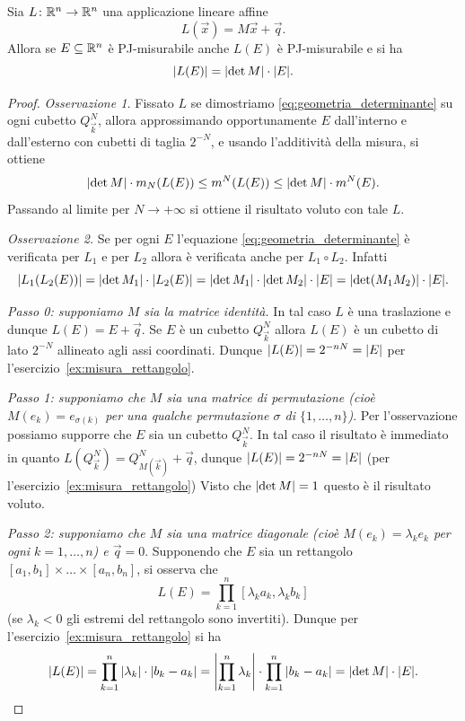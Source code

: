 \begin{theorem}
  \label{th:geometria_determinante}
Sia $L\colon {\mathbb R}^n\to {\mathbb R}^n$ una applicazione lineare affine
\[
  L(\vec x) = M\vec x + \vec q.
\]
Allora se $E\subseteq {\mathbb R}^n$ è PJ-misurabile anche $L(E)$ è PJ-misurabile 
e si ha 
\begin{equation}\label{eq:geometria_determinante}
  {\left|L(E)\right|} = {\left|\det M\right|} \cdot {\left|E\right|}.
\end{equation}
\end{theorem}
%
\begin{proof}
\emph{Osservazione 1.}
Fissato $L$ se dimostriamo 
\eqref{eq:geometria_determinante}
su ogni cubetto $Q^N_{\vec k}$, 
allora approssimando opportunamente 
$E$ dall'interno e dall'esterno con cubetti di taglia $2^{-N}$, 
e usando l'additività della misura,
si ottiene
\[
  {\left|\det M\right|} \cdot m_N(L(E)) \le m^N(L(E)) \le {\left|\det M\right|}\cdot m^N(E).
\]
Passando al limite per $N\to +\infty$ si ottiene il risultato 
voluto con tale $L$.

\emph{Osservazione 2.}
Se per ogni $E$ l'equazione 
\eqref{eq:geometria_determinante} è verificata per $L_1$ e per $L_2$ 
allora è verificata anche per 
$L_1\circ L_2$. 
Infatti
\[
  {\left|L_1(L_2(E))\right|} = {\left|\det M_1\right|} \cdot {\left|L_2(E)\right|} = {\left|\det M_1\right|} \cdot {\left|\det M_2\right|} \cdot {\left|E\right|}
  = {\left|\det(M_1M_2)\right|}\cdot{\left|E\right|}.
\]

\emph{Passo 0: supponiamo $M$ sia la matrice identità.}
In tal caso $L$ è una traslazione e dunque $L(E) = E + \vec q$.
Se $E$ è un cubetto $Q^N_{\vec k}$ allora $L(E)$ 
è un cubetto di lato $2^{-N}$ allineato agli assi coordinati.
Dunque ${\left|L(E)\right|} = 2^{-nN} = {\left|E\right|}$ per l'esercizio~\ref{ex:misura_rettangolo}.

\emph{Passo 1: supponiamo che $M$ sia una matrice di permutazione
(cioè $M(e_k) = e_{\sigma(k)}$ per una qualche permutazione $\sigma$ di
$\{1,\ldots,n\}$)}.
Per l'osservazione possiamo supporre che $E$ sia un cubetto $Q^N_{\vec k}$.
In tal caso il risultato è immediato in quanto $L(Q^N_{\vec k}) = Q^N_{M(\vec k)}+\vec q$,
dunque ${\left|L(E)\right|} = 2^{-nN} = {\left|E\right|}$ (per l'esercizio~\ref{ex:misura_rettangolo})
Visto che ${\left|\det M\right|} = 1$ questo è il risultato voluto. 

\emph{Passo 2: supponiamo che $M$ sia una matrice diagonale
(cioè $M(e_k) = \lambda_k e_k$ per ogni $k=1,\ldots,n$) e $\vec q=0$}.
Supponendo che $E$ sia un rettangolo $[a_1,b_1]\times \dots \times [a_n,b_n]$,
si osserva che 
\[
  L(E) = \prod_{k=1}^n [\lambda_k a_k, \lambda_k b_k]
\]
(se $\lambda_k < 0$ gli estremi del rettangolo sono invertiti).
Dunque per l'esercizio~\ref{ex:misura_rettangolo} si ha
\[
  {\left|L(E)\right|} = \prod_{k=1}^n {\left|\lambda_k\right|}\cdot {\left|b_k-a_k\right|}
  = {\left|\prod_{k=1}^n \lambda_k \right|} \cdot \prod_{k=1}^n {\left|b_k - a_k\right|} 
  = {\left|\det M\right|} \cdot {\left|E\right|}.
\]


\end{proof}
